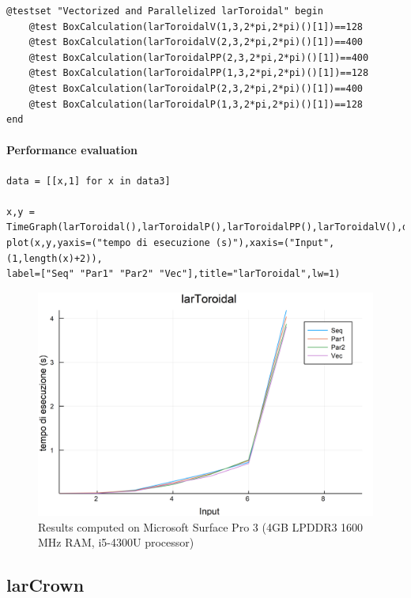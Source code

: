 \documentclass{article}
\begin{document}
\begin{Verbatim}
@testset "Vectorized and Parallelized larToroidal" begin
    @test BoxCalculation(larToroidalV(1,3,2*pi,2*pi)()[1])==128
    @test BoxCalculation(larToroidalV(2,3,2*pi,2*pi)()[1])==400
    @test BoxCalculation(larToroidalPP(2,3,2*pi,2*pi)()[1])==400
    @test BoxCalculation(larToroidalPP(1,3,2*pi,2*pi)()[1])==128
    @test BoxCalculation(larToroidalP(2,3,2*pi,2*pi)()[1])==400
    @test BoxCalculation(larToroidalP(1,3,2*pi,2*pi)()[1])==128
end
\end{Verbatim}

\paragraph{Performance evaluation}

\begin{Verbatim}
data = [[x,1] for x in data3]

x,y = TimeGraph(larToroidal(),larToroidalP(),larToroidalPP(),larToroidalV(),data,5)
plot(x,y,yaxis=("tempo di esecuzione (s)"),xaxis=("Input",(1,length(x)+2)),
label=["Seq" "Par1" "Par2" "Vec"],title="larToroidal",lw=1)

\end{Verbatim}

\begin{figure}[htbp] 
\centering 
\includegraphics[scale=.13]{larToroidalTime.png} 
\caption{Results computed on Microsoft Surface Pro  3 (4GB LPDDR3 1600 MHz RAM, i5-4300U processor)} 
\end{figure}

\subsection{larCrown}
\end{document}
